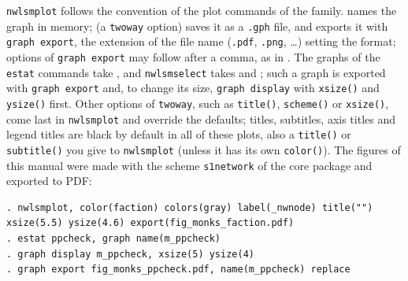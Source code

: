 \texttt{nwlsmplot} follows the convention of the plot commands of the family.  names the graph in memory;  (a \texttt{twoway} option) saves it as a \texttt{.gph} file, and  exports it with \texttt{graph export}, the extension of the file name (\texttt{.pdf}, \texttt{.png}, \dots) setting the format; options of \texttt{graph export} may follow after a comma, as in . The graphs of the \texttt{estat} commands take , and \texttt{nwlsmselect} takes  and ; such a graph is exported with \texttt{graph export} and, to change its size, \texttt{graph display} with \texttt{xsize()} and \texttt{ysize()} first. Other options of \texttt{twoway}, such as \texttt{title()}, \texttt{scheme()} or \texttt{xsize()}, come last in \texttt{nwlsmplot} and override the defaults; titles, subtitles, axis titles and legend titles are black by default in all of these plots, also a \texttt{title()} or \texttt{subtitle()} you give to \texttt{nwlsmplot} (unless it has its own \texttt{color()}). The figures of this manual were made with the scheme \texttt{s1network} of the core package and exported to PDF:
\begin{lstlisting}
. nwlsmplot, color(faction) colors(gray) label(_nwnode) title("") xsize(5.5) ysize(4.6) export(fig_monks_faction.pdf)
. estat ppcheck, graph name(m_ppcheck)
. graph display m_ppcheck, xsize(5) ysize(4)
. graph export fig_monks_ppcheck.pdf, name(m_ppcheck) replace
\end{lstlisting}

